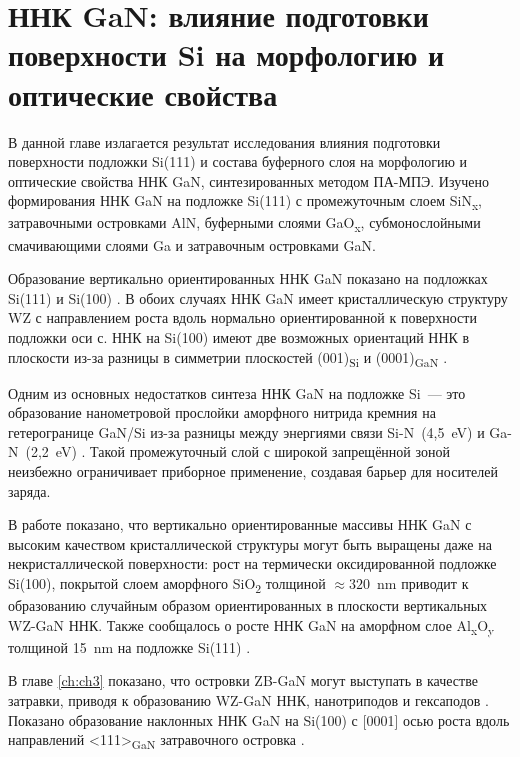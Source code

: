\chapter{ННК GaN: влияние подготовки поверхности Si на морфологию и оптические
свойства}\label{ch:ch4}

В данной главе излагается результат исследования влияния подготовки поверхности
подложки Si(111) и состава буферного слоя на морфологию и оптические свойства
ННК GaN, синтезированных методом ПА-МПЭ. Изучено формирования ННК GaN на
подложке Si(111) с промежуточным слоем SiN\textsubscript{x}, затравочными
островками AlN, буферными слоями GaO\textsubscript{x}, субмонослойными
смачивающими слоями Ga и затравочным островками GaN.

Образование вертикально ориентированных ННК GaN показано на подложках Si(111) и
Si(100) \cite{Corfdir2009}. В обоих случаях ННК GaN имеет кристаллическую
структуру WZ с направлением роста вдоль нормально ориентированной к поверхности
подложки оси с. ННК на Si(100) имеют две возможных ориентаций ННК в плоскости
из-за разницы в симметрии плоскостей (001)\textsubscript{Si} и
(0001)\textsubscript{GaN} \cite{Largeau2008}.

Одним из основных недостатков синтеза ННК GaN на подложке Si~--- это
образование нанометровой прослойки аморфного нитрида кремния на гетерогранице
GaN/Si из-за разницы между энергиями связи Si-N~(4,5~\si{\electronvolt}) и
Ga-N~(2,2~\si{\electronvolt}) \cite{Stoica2008}. Такой промежуточный слой с
широкой запрещённой зоной неизбежно ограничивает приборное применение, создавая
барьер для носителей заряда.

В работе \cite{Stoica2008} показано, что вертикально ориентированные массивы
ННК GaN с высоким качеством кристаллической структуры могут быть выращены даже
на некристаллической поверхности: рост на термически оксидированной подложке
Si(100), покрытой слоем аморфного SiO\textsubscript{2} толщиной \(\approx
320\)~\si{\nano\meter} приводит к образованию случайным образом ориентированных
в плоскости вертикальных WZ-GaN ННК.  Также сообщалось о росте ННК GaN на
аморфном слое Al\textsubscript{x}O\textsubscript{y} толщиной
15~\si{\nano\meter} на подложке Si(111) \cite{Sobanska2016}.

В главе \cref{ch:ch3} показано, что островки ZB-GaN могут выступать в качестве
затравки, приводя к образованию WZ-GaN ННК, нанотриподов и гексаподов
\cite{Lee2010, Wang2017}. Показано образование наклонных ННК GaN на Si(100) с
[0001] осью роста вдоль направлений <111>\textsubscript{GaN} затравочного
островка \cite{Borysiuk2014}.

